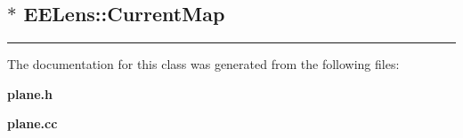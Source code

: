 \label{EELens_d8}
\subsection{$\ast$ EELens::Current\-Map\hspace{0.3cm}{\tt  [static]}}

\vspace{0.4cm}\hrule\vspace{0.2cm}
The documentation for this class was generated from the following files:\begin{CompactItemize}
\item 
{\bf plane.h}\item 
{\bf plane.cc}\end{CompactItemize}
